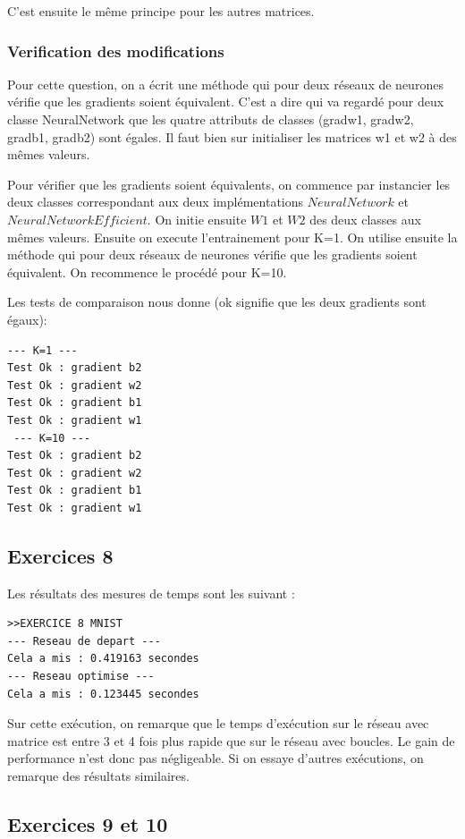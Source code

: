 \documentclass[a4paper,11pt]{article}
\begin{document}
C'est ensuite le même principe pour les autres matrices.

\subsubsection{Verification des modifications}
Pour cette question, on a écrit une méthode qui pour deux réseaux de neurones vérifie que les gradients soient équivalent. C'est a dire qui va regardé pour deux classe NeuralNetwork que les quatre attributs de classes (gradw1, gradw2, gradb1, gradb2) sont égales. Il faut bien sur initialiser les matrices w1 et w2 à des mêmes valeurs.

Pour vérifier que les gradients soient équivalents, on commence par instancier les deux classes correspondant aux deux implémentations $NeuralNetwork$ et $NeuralNetworkEfficient$. On initie ensuite $W1$ et $W2$ des deux classes aux mêmes valeurs. Ensuite on execute l'entrainement pour K=1. On utilise ensuite la méthode qui pour deux réseaux de neurones vérifie que les gradients soient équivalent. On recommence le procédé pour K=10.

Les tests de comparaison nous donne (ok signifie que les deux gradients sont égaux):

\begin{verbatim}
--- K=1 ---
Test Ok : gradient b2
Test Ok : gradient w2
Test Ok : gradient b1
Test Ok : gradient w1
 --- K=10 ---
Test Ok : gradient b2
Test Ok : gradient w2
Test Ok : gradient b1
Test Ok : gradient w1
\end{verbatim}


\subsection{Exercices 8}

Les résultats des mesures de temps sont les suivant : 

\begin{verbatim}
>>EXERCICE 8 MNIST
--- Reseau de depart ---
Cela a mis : 0.419163 secondes
--- Reseau optimise ---
Cela a mis : 0.123445 secondes
\end{verbatim}

Sur cette exécution, on remarque que le temps d'exécution sur le réseau avec matrice est entre 3 et 4 fois plus rapide que sur le réseau avec boucles. Le gain de performance n'est donc pas négligeable. Si on essaye d'autres exécutions, on remarque des résultats similaires.

\subsection{Exercices 9 et 10}
\end{document}
